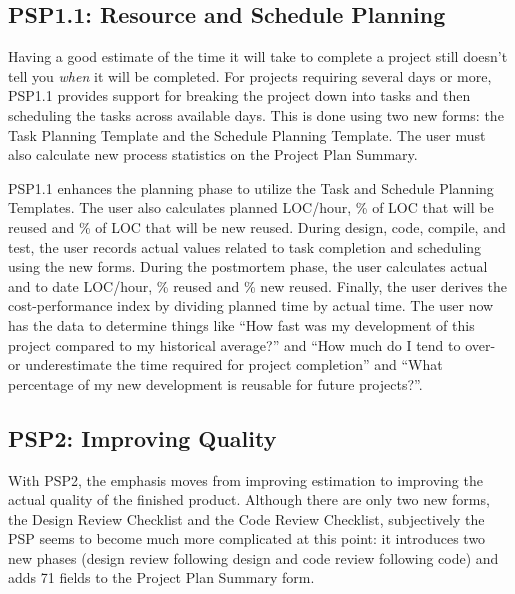 \subsection{PSP1.1: Resource and Schedule Planning}

Having a good estimate of the time it will take to complete a project still
doesn't tell you {\it when} it will be completed.  For projects requiring
several days or more, PSP1.1 provides support for breaking the project down
into tasks and then scheduling the tasks across available days. This is
done using two new forms: the Task Planning Template and the Schedule
Planning Template.  The user must also calculate new process statistics on
the Project Plan Summary.

PSP1.1 enhances the planning phase to utilize the Task and Schedule
Planning Templates.  The user also calculates planned LOC/hour, \% of LOC
that will be reused and \% of LOC that will be new reused. During design,
code, compile, and test, the user records actual values related to task
completion and scheduling using the new forms.  During the postmortem
phase, the user calculates actual and to date LOC/hour, \% reused and \%
new reused.  Finally, the user derives the cost-performance index by
dividing planned time by actual time.  The user now has the data to
determine things like ``How fast was my development of this project
compared to my historical average?'' and ``How much do I tend to over- or
underestimate the time required for project completion'' and ``What
percentage of my new development is reusable for future projects?''.

\subsection{PSP2: Improving Quality}

With PSP2, the emphasis moves from improving estimation to improving the
actual quality of the finished product.  Although there are only two new
forms, the Design Review Checklist and the Code Review Checklist,
subjectively the PSP seems to become much more complicated at this point:
it introduces two new phases (design review following design and code
review following code) and adds 71 fields to the Project Plan Summary form.

